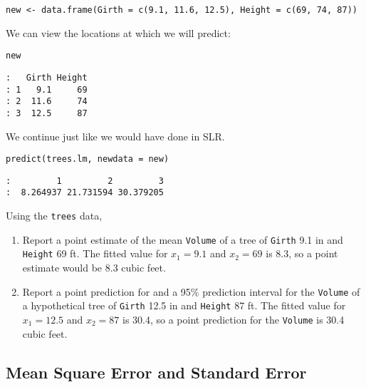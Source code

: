\begin{verbatim}
new <- data.frame(Girth = c(9.1, 11.6, 12.5), Height = c(69, 74, 87))
\end{verbatim}

We can view the locations at which we will predict:

\begin{verbatim}
new
\end{verbatim}

\begin{verbatim}
:   Girth Height
: 1   9.1     69
: 2  11.6     74
: 3  12.5     87
\end{verbatim}

We continue just like we would have done in SLR.

\begin{verbatim}
predict(trees.lm, newdata = new)
\end{verbatim}

\begin{verbatim}
:         1         2         3 
:  8.264937 21.731594 30.379205
\end{verbatim}

Using the \texttt{trees} data,
\begin{enumerate}
\item Report a point estimate of the mean \texttt{Volume} of a tree of \texttt{Girth}
9.1 in and \texttt{Height} 69 ft.  The fitted value for \(x_{1}=9.1\) and
\(x_{2} = 69\) is 8.3, so a point estimate
would be 8.3 cubic feet.
\item Report a point prediction for and a 95\% prediction interval for the
\texttt{Volume} of a hypothetical tree of \texttt{Girth} 12.5 in and \texttt{Height} 87
ft.  The fitted value for \(x_{1} = 12.5\) and \(x_{2} = 87\) is
30.4, so a point prediction for the \texttt{Volume}
is 30.4 cubic feet.
\end{enumerate}

\subsection{Mean Square Error and Standard Error}
\label{sec-12-2-3}

